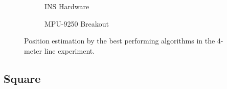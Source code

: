 \begin{figure}[!h]
    \centering
    \begin{subfigure}{0.49\textwidth}
        \centering
        \resizebox{1\linewidth}{!}{}
        \caption{INS Hardware}
        \label{fig:triangle16_2D}
    \end{subfigure}
    \begin{subfigure}{0.49\textwidth}
        \centering
        \resizebox{1\linewidth}{!}{}
        \caption{MPU-9250 Breakout}
        \label{fig:triangle16_3D}
    \end{subfigure}
    \caption{Position estimation by the best performing algorithms in the 4-meter line experiment.}
    \label{fig:triangle16}
\end{figure}



%     


\subsection{Square}

